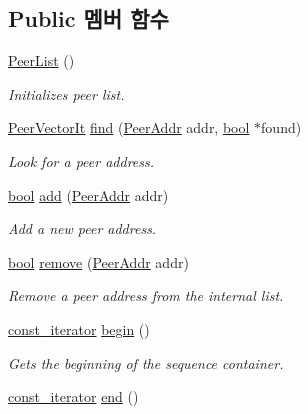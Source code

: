 \subsection*{Public 멤버 함수}
\begin{DoxyCompactItemize}
\item 
\hyperlink{class_peer_list_ac7be6cfbb79769cd3ca233b08001aa3a}{Peer\+List} ()
\begin{DoxyCompactList}\small\item\em Initializes peer list. \end{DoxyCompactList}\item 
\hyperlink{class_peer_list_a5113d4c4c744b83b83d1b4cc1aa5152a}{Peer\+Vector\+It} \hyperlink{class_peer_list_a3aa2d148cf848a5037abca6546a6125d}{find} (\hyperlink{class_peer_addr}{Peer\+Addr} addr, \hyperlink{avb__gptp_8h_af6a258d8f3ee5206d682d799316314b1}{bool} $\ast$found)
\begin{DoxyCompactList}\small\item\em Look for a peer address. \end{DoxyCompactList}\item 
\hyperlink{avb__gptp_8h_af6a258d8f3ee5206d682d799316314b1}{bool} \hyperlink{class_peer_list_a318d888e6a0754f216228f6664bed3ea}{add} (\hyperlink{class_peer_addr}{Peer\+Addr} addr)
\begin{DoxyCompactList}\small\item\em Add a new peer address. \end{DoxyCompactList}\item 
\hyperlink{avb__gptp_8h_af6a258d8f3ee5206d682d799316314b1}{bool} \hyperlink{class_peer_list_aecf651d7b2b4ad4974fb47624a64aee7}{remove} (\hyperlink{class_peer_addr}{Peer\+Addr} addr)
\begin{DoxyCompactList}\small\item\em Remove a peer address from the internal list. \end{DoxyCompactList}\item 
\hyperlink{class_peer_list_a8f607ed0489ad703402dd51ac142b251}{const\+\_\+iterator} \hyperlink{class_peer_list_ad9fa17f81ca349008fc45ad8e1a956e3}{begin} ()
\begin{DoxyCompactList}\small\item\em Gets the beginning of the sequence container. \end{DoxyCompactList}\item 
\hyperlink{class_peer_list_a8f607ed0489ad703402dd51ac142b251}{const\+\_\+iterator} \hyperlink{class_peer_list_a75fa10ba64b3954a6f9b55a49b3766e2}{end} ()

\end{DoxyCompactItemize}

